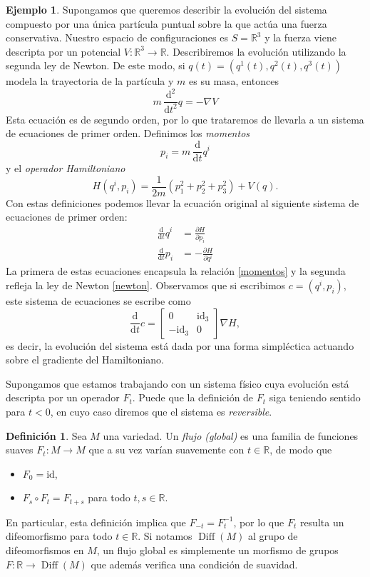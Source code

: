 \documentclass[11pt, a4paper]{article}
\newcommand{\RR}{\mathbb{R}}
\newcommand{\id}{\mathrm{id}}
\newcommand{\dd}{\mathrm{d}}
\newcommand{\ddt}{\frac{\dd}{\dd t}}
\DeclareMathOperator{\Diff}{Diff}
\theoremstyle{plain}
\theoremstyle{definition}
\newtheorem{defn}[prop]{Definición}
\newtheorem{exmp}[prop]{Ejemplo}
\begin{document}
\begin{exmp} \label{ej-hamilton} Supongamos que queremos describir la evolución del sistema compuesto por una única partícula puntual sobre la que actúa una fuerza conservativa. Nuestro espacio de configuraciones es $S=\RR^3$ y la fuerza viene descripta por un potencial $V:\RR^3\to \RR$. Describiremos la evolución utilizando la segunda ley de Newton. De este modo, si $q(t)=(q^1(t),q^2(t),q^3(t))$ modela la trayectoria de la partícula y $m$ es su masa, entonces
\begin{equation}\label{newton}
m\,\frac{\dd ^2}{\dd t^2} q= -\nabla V
\end{equation}
Esta ecuación es de segundo orden, por lo que trataremos de llevarla a un sistema de ecuaciones de primer orden. Definimos los \emph{momentos}
\begin{equation}\label{momentos}
p_i= m\,\ddt q^i
\end{equation}
y el \emph{operador Hamiltoniano}
\[H(q^i,p_i)= \frac{1}{2m}(p_1^2+p_2^2+p_3^2)+V(q).\]
Con estas definiciones podemos llevar la ecuación original al siguiente sistema de ecuaciones de primer orden:
\begin{align*}
\ddt q^i &= \frac{\partial H}{\partial p_i}\\
\ddt p_i &= -\frac{\partial H}{\partial q^i}
\end{align*}
La primera de estas ecuaciones encapsula la relación \eqref{momentos} y la segunda refleja la ley de Newton \eqref{newton}. Observamos que si escribimos $c=(q^i,p_i)$, este sistema de ecuaciones se escribe como
\[\ddt c=\begin{bmatrix}
    0 &\id_3\\
    -\id_3 & 0
\end{bmatrix}\nabla H,\]
es decir, la evolución del sistema está dada por una forma simpléctica actuando sobre el gradiente del Hamiltoniano.
\end{exmp}

Supongamos que estamos trabajando con un sistema físico cuya evolución está descripta por un operador $F_t$. Puede que la definición de $F_t$ siga teniendo sentido para $t<0$, en cuyo caso diremos que el sistema es \emph{reversible}.
\begin{defn} Sea $M$ una variedad. Un \emph{flujo (global)} es una familia de funciones suaves $F_t:M\to M$ que a su vez varían suavemente con $t\in \RR$, de modo que
\begin{itemize}
\item $F_0=\id$,
\item $F_s\circ F_t = F_{t+s}$ para todo $t,s\in \RR$.
\end{itemize}
En particular, esta definición implica que $F_{-t}=F_t^{-1}$, por lo que $F_t$ resulta un difeomorfismo para todo $t\in\RR$. Si notamos $\Diff(M)$ al grupo de difeomorfismos en $M$, un flujo global es simplemente un morfismo de grupos $F:\RR\to\Diff(M)$ que además verifica una condición de suavidad.
\end{defn}
\end{document}
